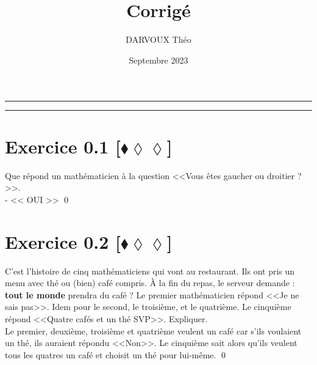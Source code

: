 \documentclass[10pt]{article}
\title{\bf{\pagetitle}\\\large{Corrigé}}
\date{Septembre 2023}
\author{DARVOUX Théo}
\def\pagetitle{Logique}
\begin{document}
\renewcommand*\contentsname{Exercices.}
\renewcommand*{\cftsecleader}{\cftdotfill{\cftdotsep}}
\maketitle
\hrule
\tableofcontents
\vspace{0.5cm}
\hrule

\thispagestyle{fancy}
\fancyhead[C]{\pagetitle}



\section*{Exercice 0.1 [$\blacklozenge\lozenge\lozenge$]}
\begin{tcolorbox}[enhanced, width=7in, center, size=fbox, fontupper=\large, drop shadow southwest]
    Que répond un mathématicien à la question <<Vous êtes gaucher ou droitier ?>>.\\
    - << OUI >> \qed
\end{tcolorbox}

\section*{Exercice 0.2 [$\blacklozenge\lozenge\lozenge$]}
\begin{tcolorbox}[enhanced, width=7in, center, size=fbox, fontupper=\large, drop shadow southwest]
    C'est l'histoire de cinq mathématiciens qui vont au restaurant. Ils ont pris un menu avec thé ou (bien) café compris. À la fin du repas, le serveur demande : \textbf{tout le monde} prendra du café ? Le premier mathématicien répond <<Je ne sais pas>>. Idem pour le second, le troisième, et le quatrième. Le cinquième répond <<Quatre cafés et un thé SVP>>. Expliquer.\\[0.5cm]
    Le premier, deuxième, troisième et quatrième veulent un café car s'ils voulaient un thé, ils auraient répondu <<Non>>. Le cinquième sait alors qu'ils veulent tous les quatres un café et choisit un thé pour lui-même. 
    \qed
\end{tcolorbox}
\end{document}
